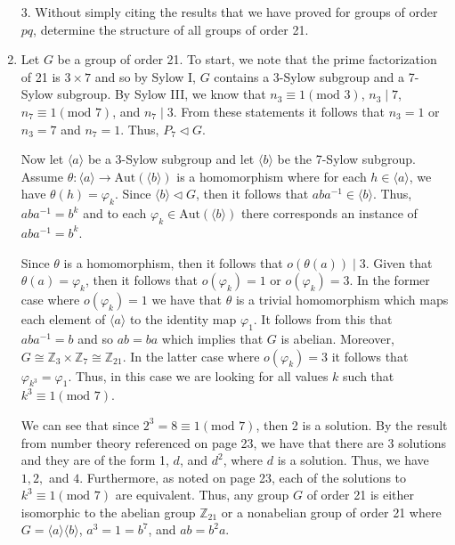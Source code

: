 \documentclass[12pt]{article}
\makeatletter
\theoremstyle{definition}
\theoremstyle{remark}
\renewenvironment{proof}[1][\proofname]{\par
  \pushQED{\qed}%
  \normalfont \topsep6\p@\@plus6\p@\relax
  \list{}{\leftmargin=0mm
          \rightmargin=4mm
          \settowidth{\itemindent}{\itshape#1}%
          \labelwidth=\itemindent
          \parsep=0pt \listparindent=\parindent 
  }
  \item[\hskip\labelsep
        \itshape
    #1\@addpunct{.}]\ignorespaces
}{%
  \popQED\endlist\@endpefalse
}
\let\oldproofname=\proofname
\renewcommand{\proofname}{\bf{\textit{\oldproofname}}}
\makeatother
\begin{document}
\begin{enumerate}[leftmargin=*]
        \item[3.] Without simply citing the results that we have proved for groups of order $pq$, determine the structure of all groups of order 21.
            \begin{proof}
                Let $G$ be a group of order 21. To start, we note that the prime factorization of 21 is $3\times 7$ and so by Sylow I, $G$ contains a 3-Sylow subgroup and a 7-Sylow subgroup. By Sylow III, we know that $n_3\equiv 1(\text{mod }3)$, $n_3\mid 7$, $n_7\equiv 1(\text{mod }7)$, and $n_7\mid 3$. From these statements it follows that $n_3=1$ or $n_3=7$ and $n_7=1$. Thus, $P_7\triangleleft G$.\par\hspace{4mm} Now let $\langle a\rangle$ be a 3-Sylow subgroup and let $\langle b\rangle$ be the 7-Sylow subgroup. Assume $\theta\colon\langle a\rangle\rightarrow\text{Aut}(\langle b\rangle)$ is a homomorphism where for each $h\in\langle a\rangle$, we have $\theta(h)=\varphi_k$. Since $\langle b\rangle\triangleleft G$, then it follows that $aba^{-1}\in\langle b\rangle$. Thus, $aba^{-1}=b^k$ and to each $\varphi_k\in\text{Aut}(\langle b\rangle)$ there corresponds an instance of $aba^{-1}=b^k$.\par\hspace{4mm} Since $\theta$ is a homomorphism, then it follows that $o(\theta(a))\mid 3$. Given that $\theta(a)=\varphi_k$, then it follows that $o(\varphi_k)=1$ or $o(\varphi_k)=3$. In the former case where $o(\varphi_k)=1$ we have that $\theta$ is a trivial homomorphism which maps each element of $\langle a\rangle$ to the identity map $\varphi_1$. It follows from this that $aba^{-1}=b$ and so $ab=ba$ which implies that $G$ is abelian. Moreover, $G\cong\mathbb{Z}_3\times\mathbb{Z}_7\cong\mathbb{Z}_{21}$. In the latter case where $o(\varphi_k)=3$ it follows that $\varphi_{k^3}=\varphi_1$. Thus, in this case we are looking for all values $k$ such that $k^3\equiv 1(\text{mod }7)$.\par\hspace{4mm} We can see that since $2^3=8\equiv 1(\text{mod }7)$, then 2 is a solution. By the result from number theory referenced on page 23, we have that there are 3 solutions and they are of the form 1, $d$, and $d^2$, where $d$ is a solution. Thus, we have $1, 2,$ and $4$. Furthermore, as noted on page 23, each of the solutions to $k^3\equiv 1(\text{mod }7)$ are equivalent. Thus, any group $G$ of order 21 is either isomorphic to the abelian group $\mathbb{Z}_{21}$ or a nonabelian group of order 21 where $G=\langle a\rangle\langle b\rangle$, $a^3=1=b^7$, and $ab=b^2a$.
            \end{proof}
            

\end{enumerate}
\end{document}
